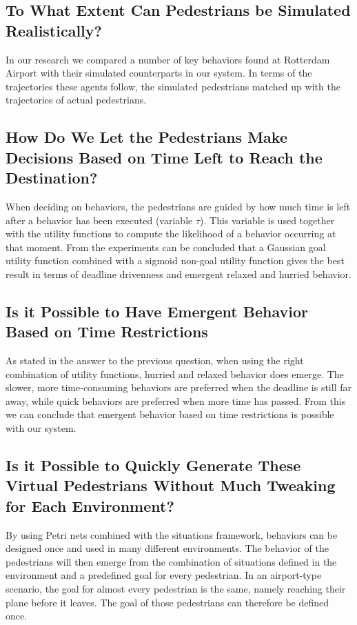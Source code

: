 \documentclass[11pt, a4paper]{book}
\begin{document}
\subsection{To What Extent Can Pedestrians be Simulated Realistically?}
In our research we compared a number of key behaviors found at Rotterdam Airport with their simulated counterparts in our system. In terms of the trajectories these agents follow, the simulated pedestrians matched up with the trajectories of actual pedestrians. 

\subsection{How Do We Let the Pedestrians Make Decisions Based on Time Left to Reach the Destination?}
When deciding on behaviors, the pedestrians are guided by how much time is left after a behavior has been executed (variable $\tau$). This variable is used together with the utility functions to compute the likelihood of a behavior occurring at that moment. From the experiments can be concluded that a Gaussian goal utility function combined with a sigmoid non-goal utility function gives the best result in terms of deadline drivenness and emergent relaxed and hurried behavior.

\subsection{Is it Possible to Have Emergent Behavior Based on Time Restrictions}
As stated in the answer to the previous question, when using the right combination of utility functions, hurried and relaxed behavior does emerge. The slower, more time-consuming behaviors are preferred when the deadline is still far away, while quick behaviors are preferred when more time has passed. From this we can conclude that emergent behavior based on time restrictions is possible with our system.

\subsection{Is it Possible to Quickly Generate These Virtual Pedestrians Without Much Tweaking for Each Environment?}
By using Petri nets combined with the situations framework, behaviors can be designed once and used in many different environments. The behavior of the pedestrians will then emerge from the combination of situations defined in the environment and a predefined goal for every pedestrian. In an airport-type scenario, the goal for almost every pedestrian is the same, namely reaching their plane before it leaves. The goal of those pedestrians can therefore be defined once.
\end{document}
